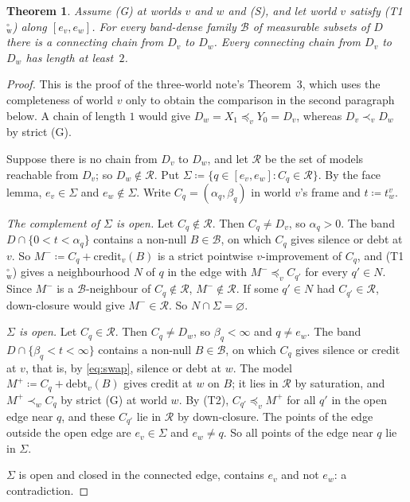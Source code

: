 \documentclass[11pt]{article}
\newtheorem{theorem}{Theorem}
\theoremstyle{definition}\newtheorem{definition}[theorem]{Definition}
\theoremstyle{remark}\newtheorem{remark}[theorem]{Remark}
\newcommand{\debt}{\mathrm{debt}}
\newcommand{\cred}{\mathrm{credit}}
\newcommand{\Bfam}{\mathcal B}
\newcommand{\Tw}{\textup{(T1$^\circ_{\mathrm w}$)}}
\begin{document}
\begin{theorem}\label{thm:cut}
Assume (G) at worlds $v$ and $w$ and (S), and let world $v$ satisfy \Tw{}
along $[e_v,e_w]$. For every band-dense family $\Bfam$ of measurable subsets
of $D$ there is a connecting chain from $D_v$ to $D_w$. Every connecting
chain from $D_v$ to $D_w$ has length at least~$2$.
\end{theorem}
\begin{proof}
This is the proof of the three-world note's Theorem~3, which uses the
completeness of world $v$ only to obtain the comparison in the second
paragraph below. A chain of length $1$ would give
$D_w=X_1\preceq_vY_0=D_v$, whereas $D_v\prec_vD_w$ by strict (G).

Suppose there is no chain from $D_v$ to $D_w$, and let $\mathcal R$ be the
set of models reachable from $D_v$; so $D_w\notin\mathcal R$. Put
$\Sigma\coloneqq\{q\in[e_v,e_w]:C_q\in\mathcal R\}$. By the face lemma,
$e_v\in\Sigma$ and $e_w\notin\Sigma$. Write $C_q=(\alpha_q,\beta_q)$ in
world $v$'s frame and $t\coloneqq t^v_w$.

\emph{The complement of $\Sigma$ is open.} Let $C_q\notin\mathcal R$. Then
$C_q\ne D_v$, so $\alpha_q>0$. The band $D\cap\{0<t<\alpha_q\}$ contains a
non-null $B\in\Bfam$, on which $C_q$ gives silence or debt at $v$. So
$M^-\coloneqq C_q+\cred_v(B)$ is a strict pointwise $v$-improvement of
$C_q$, and \Tw{} gives a neighbourhood $N$ of $q$ in the edge with
$M^-\preceq_vC_{q'}$ for every $q'\in N$. Since $M^-$ is a $\Bfam$-neighbour
of $C_q\notin\mathcal R$, $M^-\notin\mathcal R$. If some $q'\in N$ had
$C_{q'}\in\mathcal R$, down-closure would give $M^-\in\mathcal R$. So
$N\cap\Sigma=\varnothing$.

\emph{$\Sigma$ is open.} Let $C_q\in\mathcal R$. Then $C_q\ne D_w$, so
$\beta_q<\infty$ and $q\ne e_w$. The band $D\cap\{\beta_q<t<\infty\}$
contains a non-null $B\in\Bfam$, on which $C_q$ gives silence or credit at
$v$, that is, by \eqref{eq:swap}, silence or debt at $w$. The model
$M^+\coloneqq C_q+\debt_v(B)$ gives credit at $w$ on $B$; it lies in
$\mathcal R$ by saturation, and $M^+\prec_wC_q$ by strict (G) at world $w$.
By (T2), $C_{q'}\preceq_vM^+$ for all $q'$ in the open edge near $q$, and
these $C_{q'}$ lie in $\mathcal R$ by down-closure. The points of the edge
outside the open edge are $e_v\in\Sigma$ and $e_w\ne q$. So all points of
the edge near $q$ lie in $\Sigma$.

$\Sigma$ is open and closed in the connected edge, contains $e_v$ and not
$e_w$: a contradiction.
\end{proof}
\end{document}
